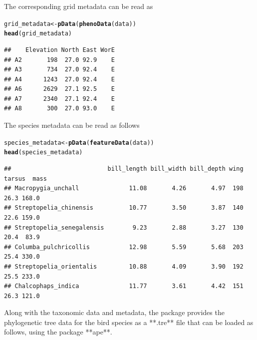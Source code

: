 \documentclass[12pt]{article}\usepackage[]{graphicx}\usepackage[usenames,dvipsnames]{color}
\makeatletter
\newcommand{\hlstd}[1]{\textcolor[rgb]{0.345,0.345,0.345}{#1}}%
\newcommand{\hlkwb}[1]{\textcolor[rgb]{0.69,0.353,0.396}{#1}}%
\newcommand{\hlkwd}[1]{\textcolor[rgb]{0.737,0.353,0.396}{\textbf{#1}}}%
\newenvironment{kframe}{%
 \def\at@end@of@kframe{}%
 \ifinner\ifhmode%
  \def\at@end@of@kframe{\end{minipage}}%
  \begin{minipage}{\columnwidth}%
 \fi\fi%
 \def\FrameCommand##1{\hskip\@totalleftmargin \hskip-\fboxsep
 \colorbox{shadecolor}{##1}\hskip-\fboxsep
     \hskip-\linewidth \hskip-\@totalleftmargin \hskip\columnwidth}%
 \MakeFramed {\advance\hsize-\width
   \@totalleftmargin\z@ \linewidth\hsize
   \@setminipage}}%
 {\par\unskip\endMakeFramed%
 \at@end@of@kframe}
\newenvironment{knitrout}{}{} %
\makeatother
\begin{document}
The corresponding grid metadata can be read as

\begin{knitrout}
\color{fgcolor}\begin{kframe}
\begin{alltt}
\hlstd{grid_metadata} \hlkwb{<-} \hlkwd{pData}\hlstd{(}\hlkwd{phenoData}\hlstd{(data))}
\hlkwd{head}\hlstd{(grid_metadata)}
\end{alltt}
\begin{verbatim}
##    Elevation North East WorE
## A2       198  27.0 92.9    E
## A3       734  27.0 92.4    E
## A4      1243  27.0 92.4    E
## A6      2629  27.1 92.5    E
## A7      2340  27.1 92.4    E
## A8       300  27.0 93.0    E
\end{verbatim}
\end{kframe}
\end{knitrout}

The species metadata can be read as follows

\begin{knitrout}
\color{fgcolor}\begin{kframe}
\begin{alltt}
\hlstd{species_metadata} \hlkwb{<-} \hlkwd{pData}\hlstd{(}\hlkwd{featureData}\hlstd{(data))}
\hlkwd{head}\hlstd{(species_metadata)}
\end{alltt}
\begin{verbatim}
##                           bill_length bill_width bill_depth wing tarsus  mass
## Macropygia_unchall              11.08       4.26       4.97  198   26.3 168.0
## Streptopelia_chinensis          10.77       3.50       3.87  140   22.6 159.0
## Streptopelia_senegalensis        9.23       2.88       3.27  130   20.4  83.9
## Columba_pulchricollis           12.98       5.59       5.68  203   25.4 330.0
## Streptopelia_orientalis         10.88       4.09       3.90  192   25.5 233.0
## Chalcophaps_indica              11.77       3.61       4.42  151   26.3 121.0
\end{verbatim}
\end{kframe}
\end{knitrout}


Along with the taxonomic data and metadata, the package provides the phylogenetic tree data for the bird species as a **.tre** file that can be loaded as follows, using the package **ape**.
\end{document}
